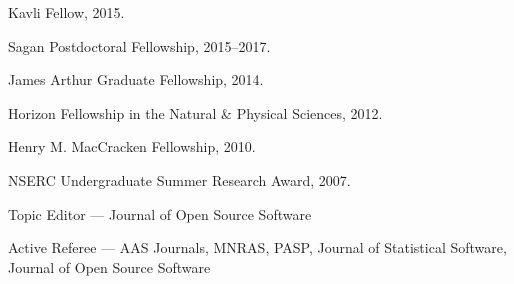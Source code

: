 \documentclass[12pt,letterpaper]{article}
\begin{document}
\begin{list}{}{\cvlist}

\item Kavli Fellow, 2015.
\item Sagan Postdoctoral Fellowship, 2015--2017.
\item James Arthur Graduate Fellowship, 2014.
\item Horizon Fellowship in the Natural \& Physical Sciences, 2012.
\item Henry M. MacCracken Fellowship, 2010.
\item NSERC Undergraduate Summer Research Award, 2007.

\end{list}


\begin{list}{}{\cvlist}
\item Topic Editor --- Journal of Open Source Software
\item Active Referee ---
    AAS Journals,
    MNRAS,
    PASP,
    Journal of Statistical Software,
    Journal of Open Source Software
\end{list}
\end{document}

